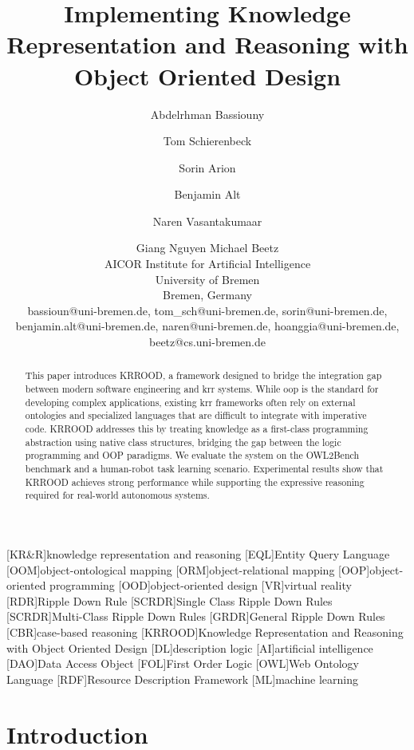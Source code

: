 \documentclass{article}
\title{Implementing Knowledge Representation and Reasoning with Object Oriented Design}
\author{
Abdelrhman Bassiouny\and
Tom Schierenbeck\and
Sorin Arion\and
Benjamin Alt\and
Naren Vasantakumaar\and
Giang Nguyen\And
Michael Beetz\\
\affiliations
AICOR Institute for Artificial Intelligence\\
University of Bremen\\
Bremen, Germany\\
\emails
bassioun@uni-bremen.de,
tom\_sch@uni-bremen.de,
sorin@uni-bremen.de,
benjamin.alt@uni-bremen.de,
naren@uni-bremen.de,
hoanggia@uni-bremen.de,
beetz@cs.uni-bremen.de
}
\begin{document}
[KR\&R]{knowledge representation and reasoning}
[EQL]{Entity Query Language}
[OOM]{object-ontological mapping}
[ORM]{object-relational mapping}
[OOP]{object-oriented programming}
[OOD]{object-oriented design}
[VR]{virtual reality}
[RDR]{Ripple Down Rule}
[SCRDR]{Single Class Ripple Down Rules}
[SCRDR]{Multi-Class Ripple Down Rules}
[GRDR]{General Ripple Down Rules}
[CBR]{case-based reasoning}
[KRROOD]{Knowledge Representation and Reasoning with Object Oriented Design}
[DL]{description logic}
[AI]{artificial intelligence}
[DAO]{Data Access Object}
[FOL]{First Order Logic}
[OWL]{Web Ontology Language}
[RDF]{Resource Description Framework}
[ML]{machine learning}



\maketitle


\begin{abstract}
This paper introduces KRROOD, a framework designed to bridge the integration gap between modern software engineering and \ac{krr} systems. While \ac{oop} is the standard for developing complex applications, existing \ac{krr} frameworks often rely on external ontologies and specialized languages that are difficult to integrate with imperative code. KRROOD addresses this by treating knowledge as a first-class programming abstraction using native class structures, bridging the gap between the logic programming and OOP paradigms. We evaluate the system on the OWL2Bench benchmark and a human-robot task learning scenario. Experimental results show that KRROOD achieves strong performance while supporting the expressive reasoning required for real-world autonomous systems.
\end{abstract}

\section{Introduction}
\label{sec:introduction}
\end{document}
